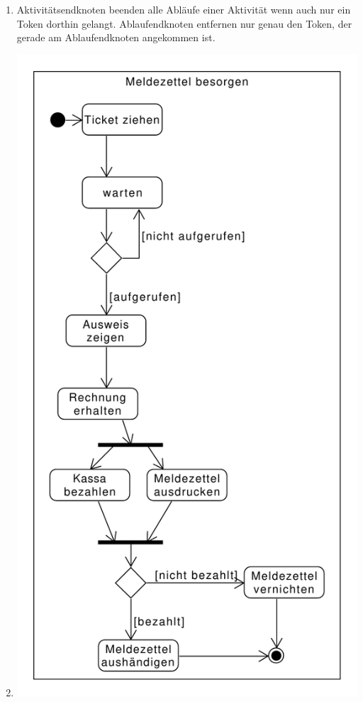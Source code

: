 \documentclass[a4paper, 12pt, margins=2.5cm]{homework}
\begin{document}
  
  \begin{problem}
    
  \end{problem}
  \begin{solution}\hfill
    \begin{enumerate}[label=\alph*)]\itemsep0pt
      \item Aktivitätsendknoten beenden alle Abläufe einer Aktivität wenn auch nur
            ein Token dorthin gelangt. Ablaufendknoten entfernen nur genau den Token,
            der gerade am Ablaufendknoten angekommen ist. 

      \item \hfill
        \begin{center}
          \includegraphics[scale=0.6]{Aufgabe3b.pdf}
        \end{center}


\end{enumerate}
\end{solution}
\end{document}
